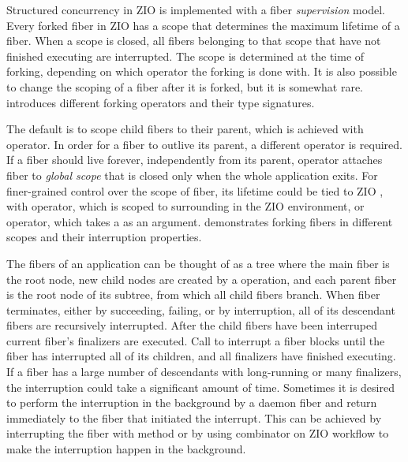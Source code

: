 

Structured concurrency in ZIO is implemented with a fiber \textit{supervision} model. Every forked fiber in ZIO has a scope that determines the maximum lifetime of a fiber. When a scope is closed, all fibers belonging to that scope that have not finished executing are interrupted. The scope is determined at the time of forking, depending on which operator the forking is done with. It is also possible to change the scoping of a fiber after it is forked, but it is somewhat rare.  introduces different forking operators and their type signatures.



The default is to scope child fibers to their parent, which is achieved with  operator. In order for a fiber to outlive its parent, a different operator is required. If a fiber should live forever, independently from its parent,  operator attaches fiber to \textit{global scope} that is closed only when the whole application exits. For finer-grained control over the scope of fiber, its lifetime could be tied to ZIO , with  operator, which is scoped to surrounding  in the ZIO environment, or  operator, which takes a  as an argument.  demonstrates forking fibers in different scopes and their interruption properties.



The fibers of an application can be thought of as a tree where the main fiber is the root node, new child nodes are created by a  operation, and each parent fiber is the root node of its subtree, from which all child fibers branch. When fiber terminates, either by succeeding, failing, or by interruption, all of its descendant fibers are recursively interrupted. After the child fibers have been interruped current fiber's finalizers are executed. Call to interrupt a fiber blocks until the fiber has interrupted all of its children, and all finalizers have finished executing. If a fiber has a large number of descendants with long-running or many finalizers, the interruption could take a significant amount of time. Sometimes it is desired to perform the interruption in the background by a daemon fiber and return immediately to the fiber that initiated the interrupt. This can be achieved by interrupting the fiber with  method or by using  combinator on ZIO workflow to make the interruption happen in the background.


